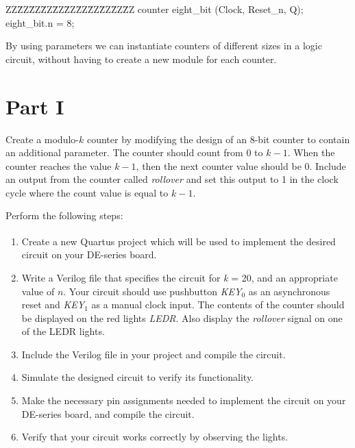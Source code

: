 \documentclass[epsfig,10pt,fullpage]{article}
\begin{document}
\begin{center}
\begin{minipage}[t]{12.5 cm}
\begin{tabbing}
ZZ\=ZZ\=ZZ\=ZZ\=ZZ\=ZZ\=ZZ\=ZZ\=ZZ\=ZZ\=ZZ\kill
counter eight\_bit (Clock, Reset\_n, Q);\\
 eight\_bit.n = 8;
\end{tabbing}
\end{minipage}
\end{center}

By using parameters we can instantiate counters of different sizes in a logic circuit, without 
having to create a new module for each counter.

\section*{Part I}
Create a modulo-$k$ counter by modifying the design of an 8-bit counter to contain an 
additional parameter. The counter should count from $0$ to $k-1$. When the counter reaches 
the value $k-1$, then the next counter value should be $0$. Include an output from the
counter called {\it rollover} and set this output to 1 in the clock cycle where the count value
is equal to $k-1$.

Perform the following steps:
\begin{enumerate}
\item Create a new Quartus\textsuperscript{\textregistered} project which will be used to implement the desired circuit
on your DE-series board.
\item Write a Verilog file that specifies the circuit for {\it k} = 20, and an appropriate
value of $n$.  Your circuit should use pushbutton {\it KEY}$_0$ as an asynchronous reset 
and {\it KEY}$_1$ as a manual clock input. 
The contents of the counter should be displayed on the red lights {\it LEDR}. Also display 
the {\it rollover} signal on one of the LEDR lights.
\item Include the Verilog file in your project and compile the circuit.
\item Simulate the designed circuit to verify its functionality.
\item Make the necessary pin assignments needed to implement the circuit on your
DE-series board, and compile the circuit.
\item Verify that your circuit works correctly by observing the lights.
\end{enumerate}
\end{document}
